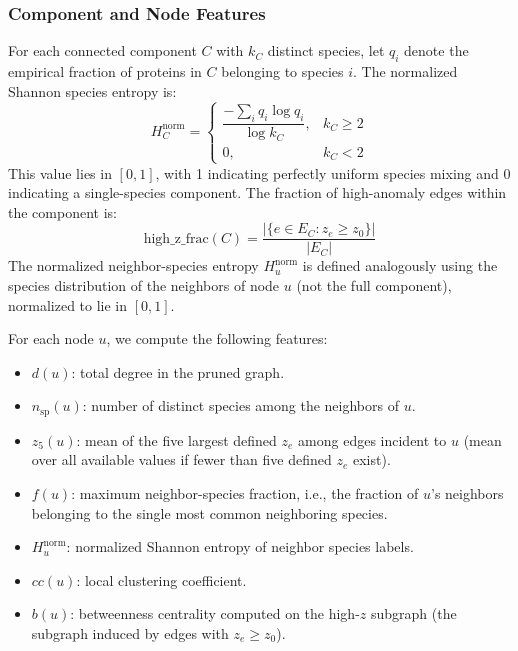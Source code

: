 \documentclass[11pt]{article}
\begin{document}
\subsubsection{Component and Node Features}

For each connected component $C$ with $k_C$ distinct species, let $q_i$ denote the empirical fraction of proteins in $C$ belonging to species $i$. The normalized Shannon species entropy is\cite{ShannonEntropy}:
\begin{equation}
H_C^{\mathrm{norm}} =
\begin{cases}
\dfrac{-\sum_i q_i \log q_i}{\log k_C}, & k_C \ge 2 \\[8pt]
0, & k_C < 2
\end{cases}
\end{equation}
This value lies in $[0,1]$, with 1 indicating perfectly uniform species mixing and 0 indicating a single-species component. The fraction of high-anomaly edges within the component is:
\begin{equation}
\mathrm{high\_z\_frac}(C) = \frac{|\{e \in E_C : z_e \ge z_0\}|}{|E_C|}
\end{equation}
The normalized neighbor-species entropy $H_u^{\mathrm{norm}}$ is defined analogously using the species distribution of the neighbors of node $u$ (not the full component), normalized to lie in $[0,1]$.

For each node $u$, we compute the following features:
\begin{itemize}[noitemsep]
    \item $d(u)$: total degree in the pruned graph.
    \item $n_{\mathrm{sp}}(u)$: number of distinct species among the neighbors of $u$.
    \item $z_5(u)$: mean of the five largest defined $z_e$ among edges incident to $u$ (mean over all available values if fewer than five defined $z_e$ exist).
    \item $f(u)$: maximum neighbor-species fraction, i.e., the fraction of $u$'s neighbors belonging to the single most common neighboring species.
    \item $H_u^{\mathrm{norm}}$: normalized Shannon entropy of neighbor species labels.
    \item $cc(u)$: local clustering coefficient\cite{Watts1998}.
    \item $b(u)$: betweenness centrality computed on the high-$z$ subgraph (the subgraph induced by edges with $z_e \ge z_0$)\cite{Guimera2005}.
\end{itemize}
\end{document}
